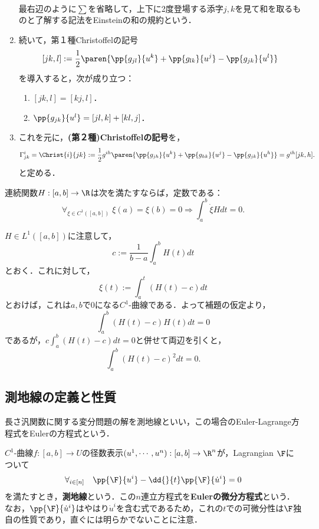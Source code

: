 \documentclass[uplatex,dvipdfmx]{jsreport}
\begin{document}
\begin{notation}
\begin{enumerate}
\begin{align*}
        \end{align*}
        最右辺のように$\sum$を省略して，上下に2度登場する添字$j,k$を見て和を取るものと了解する記法をEinsteinの和の規約という．
        \item 続いて，第１種Christoffelの記号
        \[[jk,l]:=\frac{1}{2}\paren{\pp{g_{jl}}{u^k}+\pp{g_{lk}}{u^j}-\pp{g_{jk}}{u^l}}\]
        を導入すると，次が成り立つ：
        \begin{enumerate}
            \item $[jk,l]=[kj,l]$．
            \item $\pp{g_{jk}}{u^l}=[jl,k]+[kl,j]$．
        \end{enumerate}
        \item これを元に，\textbf{(第２種)Christoffelの記号}を，
        \[\Gamma^i_{jk}=\Christ{i}{jk}:=\frac{1}{2}g^{ih}\paren{\pp{g_{jh}}{u^k}+\pp{g_{hk}}{u^j}-\pp{g_{jk}}{u^h}}=g^{ih}[jk,h].\]
        と定める．
    \end{enumerate}
\end{notation}

\begin{lemma}
    連続関数$H:[a,b]\to\R$は次を満たすならば，定数である：
    \[\forall_{\xi\in C^1([a,b])}\;\xi(a)=\xi(b)=0\Rightarrow\int^b_a\dot{\xi}Hdt=0.\]
\end{lemma}
\begin{Proof}
    $H\in L^1([a,b])$に注意して，
    \[c:=\frac{1}{b-a}\int^b_aH(t)dt\]
    とおく．これに対して，
    \[\xi(t):=\int^t_a(H(t)-c)dt\]
    とおけば，これは$a,b$で$0$になる$C^1$-曲線である．よって補題の仮定より，
    \[\int^b_a(H(t)-c)H(t)dt=0\]
    であるが，$c\int^b_a(H(t)-c)dt=0$と併せて両辺を引くと，
    \[\int^b_a(H(t)-c)^2dt=0.\]
\end{Proof}

\subsection{測地線の定義と性質}

\begin{tcolorbox}[colframe=ForestGreen, colback=ForestGreen!10!white,breakable,colbacktitle=ForestGreen!40!white,coltitle=black,fonttitle=\bfseries\sffamily,
title=]
    長さ汎関数に関する変分問題の解を測地線といい，この場合のEuler-Lagrange方程式をEulerの方程式という．
\end{tcolorbox}

\begin{definition}[geodesic]
    $C^1$-曲線$f:[a,b]\to U$の径数表示$(u^1,\cdots,u^n):[a,b]\to\R^n$が，Lagrangian $\F$について
    \[\forall_{i\in[n]}\quad\pp{\F}{u^i}-\dd{}{t}\pp{\F}{\dot{u}^i}=0\]
    を満たすとき，\textbf{測地線}という．この$n$連立方程式を\textbf{Eulerの微分方程式}という．
    なお，$\pp{\F}{\dot{u}^i}$はやはり$\dot{u}^i$を含む式であるため，これの$t$での可微分性は$\F$独自の性質であり，直ぐには明らかでないことに注意．
\end{definition}
\end{document}

